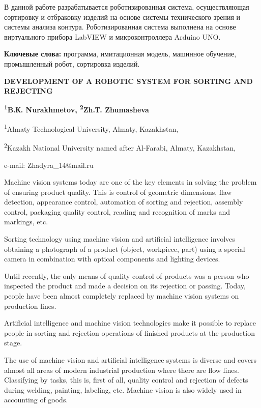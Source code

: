 В данной работе разрабатывается роботизированная система, осуществляющая
сортировку и отбраковку изделий на основе системы технического зрения и
системы анализа контура. Роботизированная система выполнена на основе
виртуального прибора LabVIEW и микроконтроллера Arduino UNO.

{\bfseries Ключевые слова:} программа, имитационная модель, машинное обучение,
промышленный робот, сортировка изделий.
\vspace{-0.5em}
\begin{articleheader}
{\bfseries DEVELOPMENT OF A ROBOTIC SYSTEM FOR SORTING AND REJECTING}

{\bfseries
\textsuperscript{1}B.К. Nurakhmetov,
\textsuperscript{2}Zh.Т. Zhumasheva\textsuperscript{\envelope }
}
\end{articleheader}

\begin{affiliation}
\textsuperscript{1}Almaty Technological University, Almaty, Kazakhstan,

\textsuperscript{2}Kazakh National University named after Al-Farabi, Almaty, Kazakhstan,

e-mail: Zhadyra\_14@mail.ru
\end{affiliation}

Machine vision systems today are one of the key elements in solving the
problem of ensuring product quality. This is control of geometric
dimensions, flaw detection, appearance control, automation of sorting
and rejection, assembly control, packaging quality control, reading and
recognition of marks and markings, etc.

Sorting technology using machine vision and artificial intelligence
involves obtaining a photograph of a product (object, workpiece, part)
using a special camera in combination with optical components and
lighting devices.

Until recently, the only means of quality control of products was a
person who inspected the product and made a decision on its rejection or
passing. Today, people have been almost completely replaced by machine
vision systems on production lines.

Artificial intelligence and machine vision technologies make it possible
to replace people in sorting and rejection operations of finished
products at the production stage.

The use of machine vision and artificial intelligence systems is diverse
and covers almost all areas of modern industrial production where there
are flow lines. Classifying by tasks, this is, first of all, quality
control and rejection of defects during welding, painting, labeling,
etc. Machine vision is also widely used in accounting of goods.

